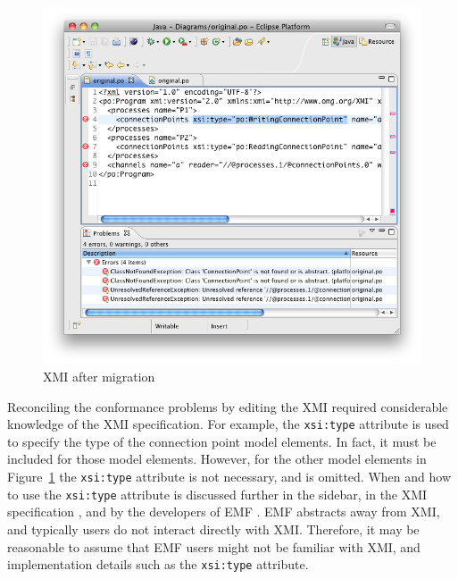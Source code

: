\begin{figure}[htbp]
	\centering
	\includegraphics[width=13.5cm]{6.Evaluation/images/user_driven/po_migrated_xmi.png}
	\caption{XMI after migration}
	\label{fig:po_migrated_xmi}
\end{figure}

Reconciling the conformance problems by editing the XMI required considerable knowledge of the XMI specification. For example, the \texttt{xsi:type} attribute is used to specify the type of the connection point model elements. In fact, it must be included for those model elements. However, for the other model elements in Figure~\ref{fig:po_migrated_xmi} the \texttt{xsi:type} attribute is not necessary, and is omitted. When and how to use the \texttt{xsi:type} attribute is discussed further in the sidebar, in the XMI specification \cite{xmi}, and by the developers of EMF \cite{steinberg09emf}. EMF abstracts away from XMI, and typically users do not interact directly with XMI. Therefore, it may be reasonable to assume that EMF users might not be familiar with XMI, and implementation details such as the \texttt{xsi:type} attribute.

